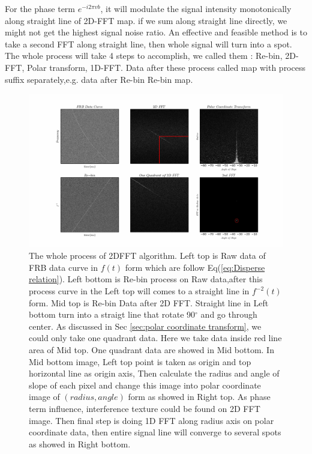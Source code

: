 \documentclass[iop]{emulateapj}
\begin{document}
For the phase term $e^{-i2\pi vb}$, it will modulate the signal intensity monotonically along straight line of 2D-FFT map. if we sum along straight line directly, we might not get the highest signal noise ratio. An effective and feasible method is to take a second FFT along straight line, then whole signal will turn into a spot. The whole process will take 4 steps to accomplish, we called them : Re-bin, 2D-FFT, Polar transform, 1D-FFT. Data after these process called map with process suffix separately,e.g. data after Re-bin  Re-bin map.


\begin{figure}

\centering
\includegraphics[width=180mm]{./pictures/procedure1.png}
\caption{The whole process of 2DFFT algorithm. Left top is Raw data of FRB data curve in $f(t)$ form which are follow Eq(\ref{eq:Disperse relation}). Left bottom is Re-bin process on Raw data,after this process curve in the Left top will comes to a straight line in $f^{-2}(t)$ form. Mid top is Re-bin Data after 2D FFT. Straight line in Left bottom turn into a straigt line that rotate 90$^{\circ}$ and go through center. As discussed in Sec \ref{sec:polar coordinate transform}, we could only take one quadrant data. Here we take data inside red line area of Mid top. One quadrant data are showed in Mid bottom. In Mid bottom image, Left top point is taken as origin and top horizontal line as origin axis, Then calculate the radius and angle of slope of each pixel and change this image into polar coordinate image of $(radius,angle)$ form as showed in Right top. As phase term influence, interference 	texture could be found on 2D FFT image. Then final step is doing 1D FFT along radius axis on polar coordinate data, then entire signal line will converge to several spots as showed in Right bottom.  \label{fig:Procedure}}
\end{figure}
\end{document}
